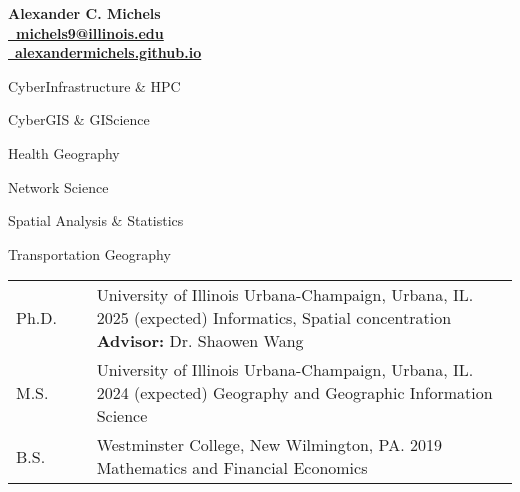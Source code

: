 \documentclass{acmcv}
\begin{document}
	\begin{multicols}{2}
		\vspace*{.15cm}
		\textbf{\LARGE Alexander C. Michels} \\
		\columnbreak
		\hfill\href{mailto:michels9@illinois.edu}{\textbf{\faEnvelope~michels9@illinois.edu}} \\
		\hfill\href{http://alexandermichels.github.io}{\faGlobeAmericas~\textbf{alexandermichels.github.io}} \\
	\end{multicols}

	
	\begin{multicols}{2}
		\begin{titemize}
			\item CyberInfrastructure \& HPC
			\item CyberGIS \& GIScience
			\item Health Geography
			\item Network Science
			\item Spatial Analysis \& Statistics
			\item Transportation Geography
		\end{titemize}
	\end{multicols}


    \begin{longtable}{p{0.16\linewidth} p{0.84\linewidth}}
        Ph.D. & University of Illinois Urbana-Champaign, Urbana, IL. 2025 (expected) \newline Informatics, Spatial concentration \textbf{Advisor:} Dr. Shaowen Wang \\

        M.S. & University of Illinois Urbana-Champaign, Urbana, IL. 2024 (expected) \newline Geography and Geographic Information Science\\

        B.S. & Westminster College, New Wilmington, PA. 2019 \newline Mathematics and Financial Economics\\
    \end{longtable}
\end{document}
